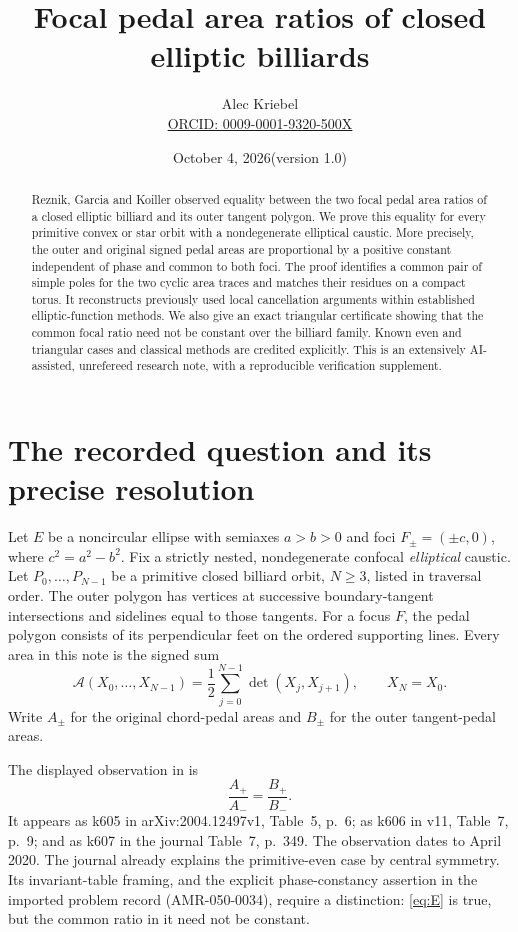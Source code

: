 \documentclass[11pt]{article}
\title{Focal pedal area ratios of closed elliptic billiards}
\author{Alec Kriebel\\\small\href{https://orcid.org/0009-0001-9320-500X}{ORCID: 0009-0001-9320-500X}}
\date{October 4, 2026\quad (version 1.0)}
\newcommand{\Area}{\mathcal A}
\begin{document}
\maketitle
\begin{abstract}
Reznik, Garcia and Koiller observed equality between the two focal pedal
area ratios of a closed elliptic billiard and its outer tangent polygon.
We prove this equality for every primitive convex or star orbit with a
nondegenerate elliptical caustic. More precisely, the outer and original
signed pedal areas are proportional by a positive constant independent of
phase and common to both foci. The proof identifies a common pair of simple
poles for the two cyclic area traces and matches their residues on a compact
torus. It reconstructs previously used local cancellation arguments within
established elliptic-function methods. We also give an exact triangular
certificate showing that the common focal ratio need not be constant over
the billiard family. Known even and triangular cases and classical methods
are credited explicitly. This is an extensively AI-assisted, unrefereed
research note, with a reproducible verification supplement.
\end{abstract}

\section{The recorded question and its precise resolution}
Let $E$ be a noncircular ellipse with semiaxes $a>b>0$ and foci
$F_\pm=(\pm c,0)$, where $c^2=a^2-b^2$. Fix a strictly nested,
nondegenerate confocal \emph{elliptical} caustic. Let
$P_0,\ldots,P_{N-1}$ be a primitive closed billiard orbit, $N\geq3$,
listed in traversal order. The outer polygon has vertices at successive
boundary-tangent intersections and sidelines equal to those tangents.
For a focus $F$, the pedal polygon consists of its perpendicular feet on
the ordered supporting lines. Every area in this note is the signed sum
\begin{equation}\label{eq:area}
 \Area(X_0,\ldots,X_{N-1})
 =\frac12\sum_{j=0}^{N-1}\det(X_j,X_{j+1}),\qquad X_N=X_0.
\end{equation}
Write $A_\pm$ for the original chord-pedal areas and $B_\pm$ for
the outer tangent-pedal areas.

The displayed observation in \cite{RGK} is
\begin{equation}\label{eq:E}
 \frac{A_+}{A_-}=\frac{B_+}{B_-}.
\end{equation}
It appears as k605 in arXiv:2004.12497v1, Table~5, p.~6;
as k606 in v11, Table~7, p.~9; and as k607 in the journal
Table~7, p.~349. The observation dates to April 2020.
The journal already explains the primitive-even case by central symmetry.
Its invariant-table framing, and the explicit phase-constancy assertion in
the imported problem record (AMR-050-0034), require a distinction:
\eqref{eq:E} is true, but the common ratio in it need not be constant.
\end{document}
